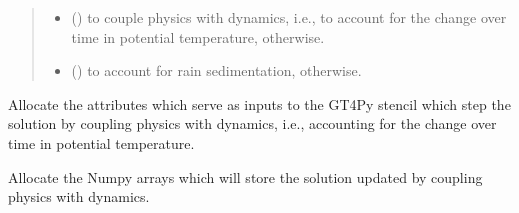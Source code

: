 \documentclass[letterpaper,10pt,english]{sphinxmanual}
\begin{document}
\begin{fulllineitems}
\begin{fulllineitems}
\begin{quote}
\begin{description}
\begin{itemize}
\item {} 
 () \textendash{}  to couple physics with dynamics, i.e., to account for the change over time in potential temperature,
 otherwise.

\item {} 
 () \textendash{}  to account for rain sedimentation,  otherwise.

\end{itemize}

\end{description}\end{quote}

\end{fulllineitems}


\begin{fulllineitems}
\label{\detokenize{api:tasmania.dycore.prognostic_isentropic_nonconservative.PrognosticIsentropicNonconservative._stencil_stepping_by_coupling_physics_with_dynamics_allocate_inputs}}
Allocate the attributes which serve as inputs to the GT4Py stencil which step the solution
by coupling physics with dynamics, i.e., accounting for the change over time in potential temperature.

\end{fulllineitems}


\begin{fulllineitems}
\label{\detokenize{api:tasmania.dycore.prognostic_isentropic_nonconservative.PrognosticIsentropicNonconservative._stencil_stepping_by_coupling_physics_with_dynamics_allocate_outputs}}
Allocate the Numpy arrays which will store the solution updated by coupling physics with dynamics.


\end{fulllineitems}
\end{fulllineitems}
\end{document}
